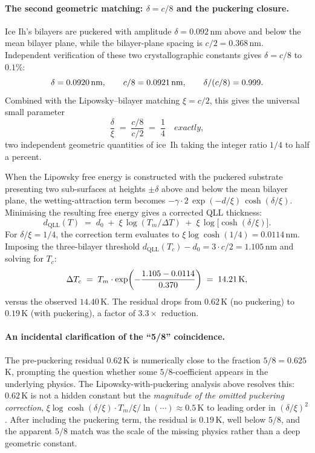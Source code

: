 \documentclass[final]{siamltex}
\begin{document}
\paragraph{The second geometric matching: $\delta = c/8$ and the
puckering closure.}
Ice Ih's bilayers are puckered with amplitude $\delta = 0.092$\,nm
above and below the mean bilayer plane, while the bilayer-plane
spacing is $c/2 = 0.368$\,nm.  Independent verification of these
two crystallographic constants gives $\delta = c/8$ to $0.1\%$:
\[
\delta = 0.0920 \text{\,nm}, \qquad c/8 = 0.0921 \text{\,nm},
\qquad \delta/(c/8) = 0.999.
\]
Combined with the Lipowsky--bilayer matching $\xi = c/2$, this
gives the universal small parameter
\begin{equation}\label{eq:eps}
\frac{\delta}{\xi} \;=\; \frac{c/8}{c/2} \;=\; \frac{1}{4} \quad
\textit{exactly},
\end{equation}
two independent geometric quantities of ice~Ih taking the integer
ratio $1/4$ to half a percent.

When the Lipowsky free energy is constructed with the puckered
substrate presenting two sub-surfaces at heights $\pm\delta$ above
and below the mean bilayer plane, the wetting-attraction term
becomes $-\gamma \cdot 2\,\exp(-d/\xi)\,\cosh(\delta/\xi)$.
Minimising the resulting free energy gives a corrected QLL
thickness:
\begin{equation}\label{eq:lipowsky-pucker}
d_{\mathrm{QLL}}(T) \;=\; d_0 \;+\; \xi \, \log(T_m/\Delta T)
                     \;+\; \xi \, \log\!\bigl[\cosh(\delta/\xi)\bigr].
\end{equation}
For $\delta/\xi = 1/4$, the correction term evaluates to
$\xi \log\cosh(1/4) = 0.0114$\,nm.  Imposing the
three-bilayer threshold $d_{\mathrm{QLL}}(T_c) - d_0 = 3 \cdot c/2
= 1.105$\,nm and solving for $T_c$:
\[
\Delta T_c \;=\; T_m \cdot \exp\!\left(-\frac{1.105 - 0.0114}{0.370}\right)
            \;=\; 14.21 \text{\,K},
\]
versus the observed $14.40$\,K.  The residual drops from
$0.62$\,K (no puckering) to $0.19$\,K (with puckering), a factor
of $3.3\times$ reduction.

\paragraph{An incidental clarification of the ``5/8'' coincidence.}
The pre-puckering residual $0.62$\,K is numerically close to the
fraction $5/8 = 0.625$\,K, prompting the question whether some
$5/8$-coefficient appears in the underlying physics.  The
Lipowsky-with-puckering analysis above resolves this: $0.62$\,K
is not a hidden constant but the \emph{magnitude of the omitted
puckering correction}, $\xi \log\cosh(\delta/\xi) \cdot
T_m/\xi/\!\ln(\cdots) \approx 0.5$\,K to leading order in
$(\delta/\xi)^2$.  After including the puckering term, the
residual is $0.19$\,K, well below $5/8$, and the apparent $5/8$
match was the scale of the missing physics rather than a deep
geometric constant.
\end{document}
